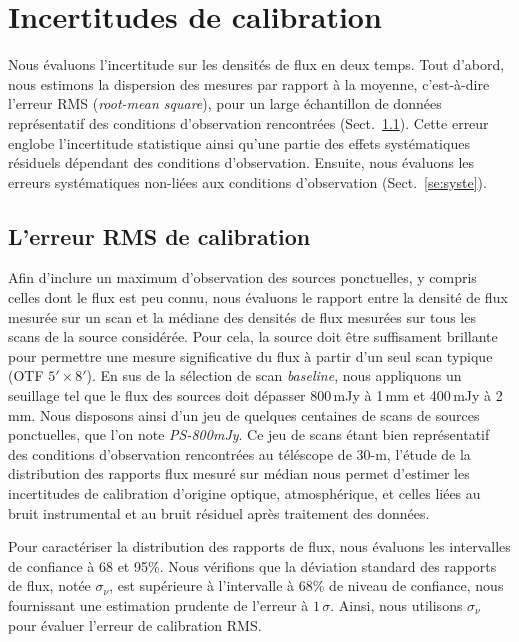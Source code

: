 %
%
%
%
%
%
%
%
%
%
\section{Incertitudes de calibration}

Nous évaluons l'incertitude sur les densités de flux en deux
temps. Tout d'abord, nous estimons la dispersion des mesures par
rapport à la moyenne, c'est-à-dire l'erreur RMS (\emph{root-mean
  square}), pour un large échantillon de données représentatif des
conditions d'observation rencontrées (Sect.~\ref{se:rms_error}). Cette
erreur englobe l'incertitude statistique ainsi qu'une partie des
effets systématiques résiduels dépendant des conditions
d'observation. Ensuite, nous évaluons les erreurs systématiques
non-liées aux conditions d'observation (Sect.~\ref{se:syste}).

\subsection{L'erreur RMS de calibration}
\label{se:rms_error}

Afin d'inclure un maximum d'observation des sources ponctuelles, y
compris celles dont le flux est peu connu, nous évaluons le rapport
entre la densité de flux mesurée sur un scan et la médiane des
densités de flux mesurées sur tous les scans de la source considérée.
Pour cela, la source doit être suffisament brillante pour permettre
une mesure significative du flux à partir d'un seul scan typique (OTF $5'
\times 8'$). En sus de la sélection de scan \emph{baseline}, nous
appliquons un seuillage tel que le flux des sources doit dépasser
800\,mJy à 1\,mm et 400\,mJy à 2\,mm. Nous disposons ainsi d'un jeu de
quelques centaines de scans de sources ponctuelles, que l'on note
\emph{PS-800mJy}. Ce jeu de scans
étant bien représentatif des conditions d'observation
rencontrées au téléscope de 30-m, l'étude de la distribution des
rapports flux mesuré sur médian nous permet d'estimer les incertitudes
de calibration d'origine optique, atmosphérique, et celles liées au
bruit instrumental et au bruit résiduel après traitement des données.

Pour caractériser la distribution des rapports de flux, nous évaluons
les intervalles de confiance à 68 et 95\%. Nous vérifions que la 
déviation standard des rapports de flux, notée $\sigma_\nu$, est
supérieure à l'intervalle à 68\% de niveau de confiance, nous
fournissant une estimation prudente de l'erreur à $1\,\sigma$. Ainsi,
nous utilisons $\sigma_\nu$ pour évaluer l'erreur de calibration RMS.

